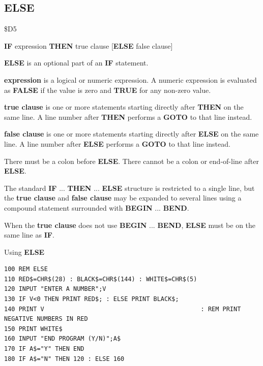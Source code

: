 \newpage
\subsection{ELSE}
\begin{description}[leftmargin=2cm,style=nextline]
\item [Token:]    \$D5

\item [Format:]   {\bf IF} expression {\bf THEN} true clause [{\bf ELSE} false clause]

\item [Usage:]    {\bf ELSE} is an optional part of an {\bf IF} statement.

                  {\bf expression} is a logical or numeric expression. A numeric expression is evaluated as {\bf FALSE} if the value is zero and {\bf TRUE} for any non-zero value.

                  {\bf true clause} is one or more statements starting directly after {\bf THEN} on the same line. A line number after {\bf THEN} performs a {\bf GOTO} to that line instead.

                  {\bf false clause} is one or more statements starting directly after {\bf ELSE} on the same line. A line number after {\bf ELSE} performs a {\bf GOTO} to that line instead.

\item [Remarks:]  There must be a colon before {\bf ELSE}. There cannot be a colon or end-of-line after {\bf ELSE}.

                  The standard {\bf IF} ... {\bf THEN} ... {\bf ELSE} structure is restricted to a single line, but the {\bf true clause} and {\bf false clause} may be expanded to several lines using a compound statement surrounded with {\bf BEGIN} ... {\bf BEND}.

                  When the {\bf true clause} does not use {\bf BEGIN} ... {\bf BEND}, {\bf ELSE} must be on the same line as {\bf IF}.

\item [Examples:] Using {\bf ELSE}

\begin{tcolorbox}[colback=black,coltext=white]
\verbatimfont{\codefont}
\begin{verbatim}
100 REM ELSE
110 RED$=CHR$(28) : BLACK$=CHR$(144) : WHITE$=CHR$(5)
120 INPUT "ENTER A NUMBER";V
130 IF V<0 THEN PRINT RED$; : ELSE PRINT BLACK$;
140 PRINT V                                           : REM PRINT NEGATIVE NUMBERS IN RED
150 PRINT WHITE$
160 INPUT "END PROGRAM (Y/N)";A$
170 IF A$="Y" THEN END
180 IF A$="N" THEN 120 : ELSE 160
\end{verbatim}
\end{tcolorbox}


\end{description}
